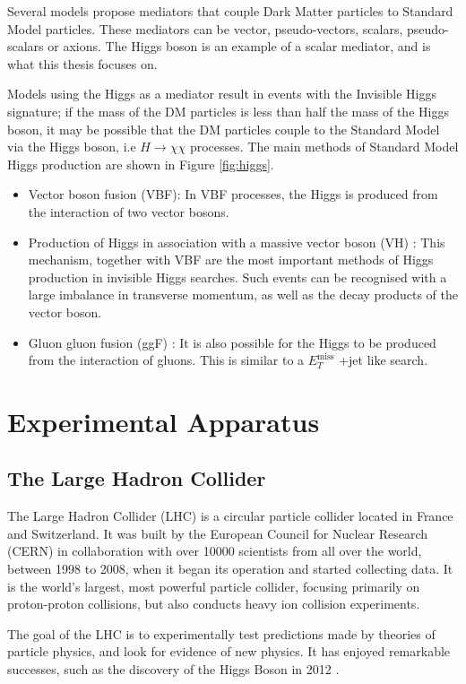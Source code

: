 \documentclass[12pt,a4paper,openright,twoside]{report}
\newcommand{\met}{$E_T^{\mathrm{miss}}$ }
\begin{document}
Several models propose mediators that couple Dark Matter particles to Standard Model particles. These mediators can be vector, pseudo-vectors, scalars, pseudo-scalars or axions. The Higgs boson is an example of a scalar mediator, and is what this thesis focuses on. 

Models using the Higgs as a mediator result in events with the Invisible Higgs signature; if the mass of the DM particles is less than half the mass of the Higgs boson, it may be possible that the DM particles couple to the Standard Model via the Higgs boson, i.e $H\to\chi\chi$ processes. The main methods of Standard Model Higgs production are shown in Figure \ref{fig:higgs}.
	\begin{itemize}
	\item Vector boson fusion (VBF): In VBF processes, the Higgs is produced from the interaction of two vector bosons.
	\item Production of Higgs in association with a massive vector boson (VH) : This mechanism, together with VBF are the most important methods of Higgs production in invisible Higgs searches. Such events can be recognised with a large imbalance in transverse momentum, as well as the decay products of the vector boson.
	\item Gluon gluon fusion (ggF) : It is also possible for the Higgs to be produced from the interaction of gluons. This is similar to a \met+jet like search.
	\end{itemize}

\chapter{Experimental Apparatus}\label{ch:LHC}

\section{The Large Hadron Collider}
The Large Hadron Collider (LHC) is a circular particle collider located in France and Switzerland. It was built by the European Council for Nuclear Research (CERN) in collaboration with over 10000 scientists from all over the world, between 1998 to 2008, when it began its operation and started collecting data. It is the world's largest, most powerful particle collider, focusing primarily on proton-proton collisions, but also conducts heavy ion collision experiments.

The goal of the LHC is to experimentally test predictions made by theories of particle physics, and look for evidence of new physics. It has enjoyed remarkable successes, such as the discovery of the Higgs Boson in 2012 \cite{Higgs,Higgs2}.
\end{document}

